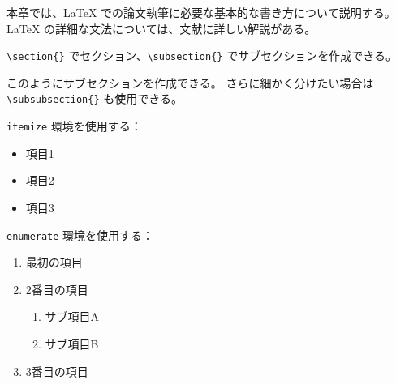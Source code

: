 \iffalse
本章では、LaTeX での論文執筆に必要な基本的な書き方について説明する。
LaTeX の詳細な文法については、文献\cite{kimura-latex}に詳しい解説がある。


\verb|\section{}| でセクション、\verb|\subsection{}| でサブセクションを作成できる。


このようにサブセクションを作成できる。
さらに細かく分けたい場合は \verb|\subsubsection{}| も使用できる。



\verb|itemize| 環境を使用する：

\begin{itemize}
  \item 項目1
  \item 項目2
  \item 項目3
\end{itemize}


\verb|enumerate| 環境を使用する：

\begin{enumerate}
  \item 最初の項目 \label{enum:first}
  \item 2番目の項目
    \begin{enumerate}
      \item サブ項目A \label{enum:sub-a}
      \item サブ項目B \label{enum:sub-b}
    \end{enumerate}
  \item 3番目の項目 \label{enum:third}
\end{enumerate}

